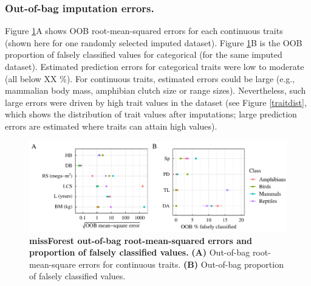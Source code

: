 \subsubsection{Out-of-bag imputation errors.}
Figure \ref{OOBerrors}A shows OOB root-mean-squared errors for each continuous traits (shown here for one randomly selected imputed dataset). Figure \ref{OOBerrors}B is the OOB proportion of falsely classified values for categorical (for the same imputed dataset).
Estimated prediction errors for categorical traits were low to moderate (all below XX \%). For continuous traits, estimated errors could be large (e.g., mammalian body mass, amphibian clutch size  or range sizes). Nevertheless, such large errors were driven by high trait values in the dataset (see Figure \ref{traitdist}, which shows the distribution of trait values after imputations; large prediction errors are estimated where traits can attain high values). 
 
\begin{figure}[h!]
\centering
\includegraphics[scale=0.75]{figures/chapter2/Imputation_errors/MSE_PFC}
\caption[missForest out-of-bag root-mean-square errors and proportion of falsely classified values]{\textbf{missForest out-of-bag root-mean-squared errors and proportion of falsely classified values.} \textbf{(A)} Out-of-bag root-mean-square errors for continuous traits. \textbf{(B)} Out-of-bag proportion of falsely classified values.}
\label{OOBerrors}
\end{figure}

